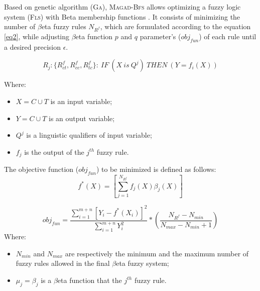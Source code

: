 			Based on genetic algorithm (\textsc{Ga}), \textsc{Magad-Bfs} allows optimizing a fuzzy logic system 
			(\textsc{Fls}) with Beta membership functions \citep{Alimi2000}. It consists of minimizing
			the number of $\beta$eta fuzzy rules $N_{R^{f}}$, which are formulated according to 
			the equation \ref{eq2}, while adjusting $\beta$eta function $p$ and $q$ parameter’s ($obj_{fun}$) 
			of each rule until a desired precision $\epsilon$. 
			 
		\begin{equation} 
			\label{eq2}
			R_{j}: \{ R_{ct}^{f}, R_{cc}^{f}, R_{tc}^{f}\}:~IF~ (X~is~Q^{j})~THEN~(Y=f_{i}(X)) 
		\end{equation} 
		 
		Where: 
		\begin{itemize} 
			\item $X = C\cup T$ is an input variable; 
			\item $Y = C\cup T$ 	is an output variable; 
			\item $Q^{j}$ is a linguistic qualifiers of input variable; 
			\item $f_{j}$ is the output of the $j^{th}$ fuzzy rule. 
		\end{itemize} 
		 
		The objective function ($obj_{fun}$) to be minimized is defined as follows: 
		\begin{equation} 
			f^{*}(X)=[\sum_{j=1}^{N_{R^{f}}} f_{j}(X)\beta_{j}(X)] 
		\end{equation} 
		 
		\begin{equation} 
		obj_{fun} = \frac{\sum_{i=1}^{m+n} [Y_{i}-f^{*}(X_{i}) ]^{2}}{\sum_{i=1}^{m+n} Y_{i}^{2} } * 
		(\frac{N_{R^{f}} - N_{min} }{N_{max} - N_{min} + 1}) 
		\end{equation} 
		Where: 
		\begin{itemize} 
			\item $N_{min}$ and $N_{max}$ are respectively the minimum and the maximum number of fuzzy rules allowed in the 
			final $\beta$eta fuzzy system; 
			\item $\mu_{j}=\beta_{j}$ is a $\beta$eta function that  the $j^{th}$ fuzzy rule. 
		\end{itemize} 
		 

